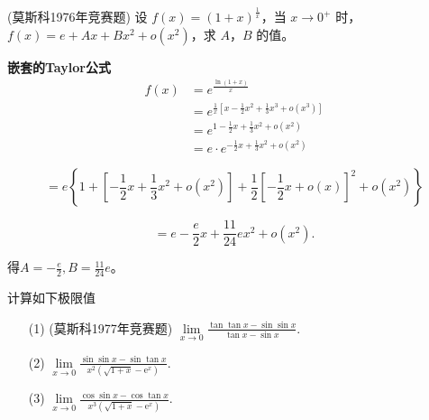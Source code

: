 \documentclass[12pt, a4paper, oneside, UTF8]{ctexbook}
\begin{document}
\begin{example}(莫斯科1976年竞赛题)
设 $f(x)=(1+x)^{\frac{1}{x}}$，当 $x\to 0^{+}$ 时，$f(x)=e+Ax+Bx^{2}+o(x^{2})$，求 $A$，$B$ 的值。
\end{example}
\begin{solution}
\textbf{嵌套的Taylor公式}
\begin{align*}
    f(x)
    &= e^{\frac{\ln(1+x)}{x}} \\
    &= e^{\frac{1}{x}\left[x-\frac{1}{2}x^{2}+\frac{1}{3}x^{3}+o\left(x^{3}\right)\right]} \\
    &= e^{1-\frac{1}{2}x+\frac{1}{3}x^{2}+o\left(x^{2}\right)} \\
    &= e\cdot e^{-\frac{1}{2}x+\frac{1}{3}x^{2}+o\left(x^{2}\right)}
\end{align*}

$$ =e\left\{1+\left[-\frac{1}{2} x+\frac{1}{3} x^{2}+o\left(x^{2}\right)\right]+\frac{1}{2}\left[-\frac{1}{2} x+o(x)\right]^{2}+o\left(x^{2}\right)\right\} $$

$$ =e-\frac{e}{2} x+\frac{11}{24} e x^{2}+o\left(x^{2}\right) . $$

得$ A=-\frac{e}{2}, B=\frac{11}{24} e $。

\end{solution}
\begin{example}
    计算如下极限值
\begin{enumerate}
    \item[(1)](莫斯科1977年竞赛题) $\lim\limits_{x\to 0}\frac{\tan\tan x-\sin\sin x}{\tan x-\sin x}$.
    \item[(2)] $\lim\limits_{x\to 0}\frac{\sin\sin x-\sin\tan x}{x^{2}(\sqrt{1+x}-\mathrm{e}^{x})}$.
    \item[(3)] $\lim\limits_{x\to 0}\frac{\cos\sin x-\cos\tan x}{x^{3}(\sqrt{1+x}-\mathrm{e}^{x})}$.
\end{enumerate}
\end{example}
\end{document}
